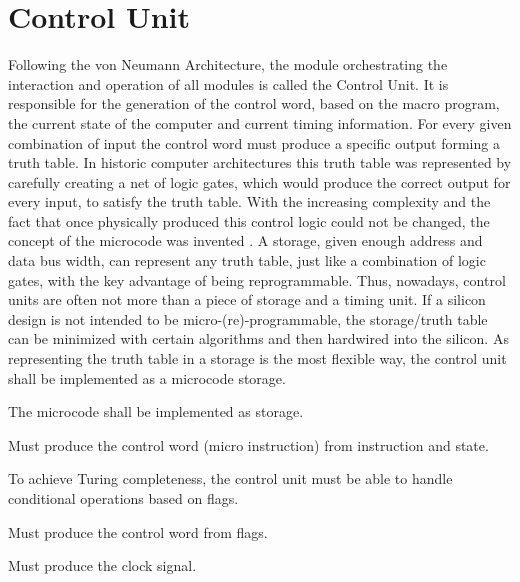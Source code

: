 \section{Control Unit}
Following the von Neumann Architecture, the module orchestrating the interaction and operation of all modules is called the Control Unit. It is responsible for the generation of the control word, based on the macro program, the current state of the computer and current timing information. For every given combination of input the control word must produce a specific output forming a truth table. In historic computer architectures this truth table was represented by carefully creating a net of logic gates, which would produce the correct output for every input, to satisfy the truth table. With the increasing complexity and the fact that once physically produced this control logic could not be changed, the concept of the microcode was invented \cite{malvino1983a}. A storage, given enough address and data bus width, can represent any truth table, just like a combination of logic gates, with the key advantage of being reprogrammable. Thus, nowadays, control units are often not more than a piece of storage and a timing unit. If a silicon design is not intended to be micro-(re)-programmable, the storage/truth table can be minimized with certain algorithms and then hardwired into the silicon. As representing the truth table in a storage is the most flexible way, the control unit shall be implemented as a microcode storage.
\begin{arch-requirement}
  The microcode shall be implemented as storage.
\end{arch-requirement}

\begin{arch-requirement} \label{req:cw-from-instr}
  Must produce the control word (micro instruction) from instruction and state.
\end{arch-requirement}

To achieve Turing completeness, the control unit must be able to handle conditional operations based on flags.

\begin{turing-requirement}
  Must produce the control word from flags.
\end{turing-requirement}



\begin{arch-requirement}
  Must produce the clock signal. 
\end{arch-requirement}

